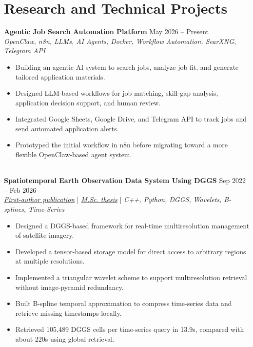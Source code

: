 \documentclass[a4paper,10pt]{article}
\begin{document}

\section*{Research and Technical Projects}

\noindent
\textbf{Agentic Job Search Automation Platform} \hfill May 2026 -- Present \\
\textit{OpenClaw, n8n, LLMs, AI Agents, Docker, Workflow Automation, SearXNG, Telegram API}
\begin{itemize}[leftmargin=0.25in]
    \item Building an agentic AI system to search jobs, analyze job fit, and generate tailored application materials.
    \item Designed LLM-based workflows for job matching, skill-gap analysis, application decision support, and human review.
    \item Integrated Google Sheets, Google Drive, and Telegram API to track jobs and send automated application alerts.
    \item Prototyped the initial workflow in n8n before migrating toward a more flexible OpenClaw-based agent system.
\end{itemize}

\noindent \\
\textbf{Spatiotemporal Earth Observation Data System Using DGGS} \hfill Sep 2022 -- Feb 2026 \\
\textit{\href{https://doi.org/10.3390/rs17040570}{First-author publication}} | \textit{\href{https://ucalgary.scholaris.ca/items/114b394b-e516-4732-bd3a-45dd6160d480}{M.Sc. thesis}} | \textit{C++, Python, DGGS, Wavelets, B-splines, Time-Series}
\begin{itemize}[leftmargin=0.25in]
    \item Designed a DGGS-based framework for real-time multiresolution management of satellite imagery.
    \item Developed a tensor-based storage model for direct access to arbitrary regions at multiple resolutions.
    \item Implemented a triangular wavelet scheme to support multiresolution retrieval without image-pyramid redundancy.
    \item Built B-spline temporal approximation to compress time-series data and retrieve missing timestamps locally.
    \item Retrieved 105,489 DGGS cells per time-series query in 13.9s, compared with about 220s using global retrieval.
\end{itemize}
\end{document}

